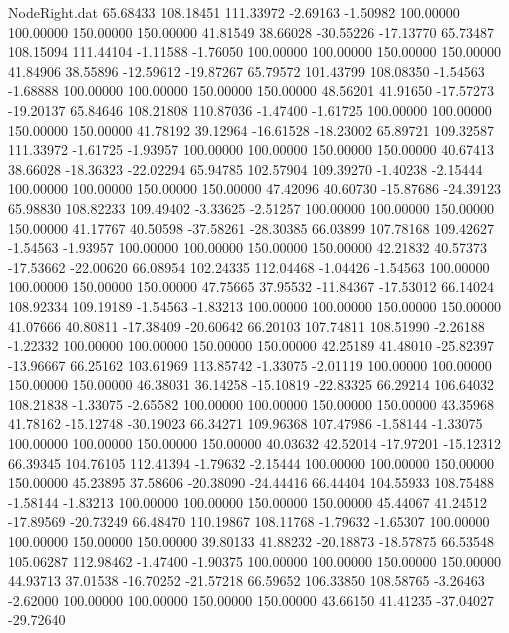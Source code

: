 \begin{filecontents}{NodeRight.dat}
  65.68433  108.18451  111.33972    -2.69163   -1.50982  100.00000  100.00000  150.00000  150.00000   41.81549   38.66028  -30.55226  -17.13770
  65.73487  108.15094  111.44104    -1.11588   -1.76050  100.00000  100.00000  150.00000  150.00000   41.84906   38.55896  -12.59612  -19.87267
  65.79572  101.43799  108.08350    -1.54563   -1.68888  100.00000  100.00000  150.00000  150.00000   48.56201   41.91650  -17.57273  -19.20137
  65.84646  108.21808  110.87036    -1.47400   -1.61725  100.00000  100.00000  150.00000  150.00000   41.78192   39.12964  -16.61528  -18.23002
  65.89721  109.32587  111.33972    -1.61725   -1.93957  100.00000  100.00000  150.00000  150.00000   40.67413   38.66028  -18.36323  -22.02294
  65.94785  102.57904  109.39270    -1.40238   -2.15444  100.00000  100.00000  150.00000  150.00000   47.42096   40.60730  -15.87686  -24.39123
  65.98830  108.82233  109.49402    -3.33625   -2.51257  100.00000  100.00000  150.00000  150.00000   41.17767   40.50598  -37.58261  -28.30385
  66.03899  107.78168  109.42627    -1.54563   -1.93957  100.00000  100.00000  150.00000  150.00000   42.21832   40.57373  -17.53662  -22.00620
  66.08954  102.24335  112.04468    -1.04426   -1.54563  100.00000  100.00000  150.00000  150.00000   47.75665   37.95532  -11.84367  -17.53012
  66.14024  108.92334  109.19189    -1.54563   -1.83213  100.00000  100.00000  150.00000  150.00000   41.07666   40.80811  -17.38409  -20.60642
  66.20103  107.74811  108.51990    -2.26188   -1.22332  100.00000  100.00000  150.00000  150.00000   42.25189   41.48010  -25.82397  -13.96667
  66.25162  103.61969  113.85742    -1.33075   -2.01119  100.00000  100.00000  150.00000  150.00000   46.38031   36.14258  -15.10819  -22.83325
  66.29214  106.64032  108.21838    -1.33075   -2.65582  100.00000  100.00000  150.00000  150.00000   43.35968   41.78162  -15.12748  -30.19023
  66.34271  109.96368  107.47986    -1.58144   -1.33075  100.00000  100.00000  150.00000  150.00000   40.03632   42.52014  -17.97201  -15.12312
  66.39345  104.76105  112.41394    -1.79632   -2.15444  100.00000  100.00000  150.00000  150.00000   45.23895   37.58606  -20.38090  -24.44416
  66.44404  104.55933  108.75488    -1.58144   -1.83213  100.00000  100.00000  150.00000  150.00000   45.44067   41.24512  -17.89569  -20.73249
  66.48470  110.19867  108.11768    -1.79632   -1.65307  100.00000  100.00000  150.00000  150.00000   39.80133   41.88232  -20.18873  -18.57875
  66.53548  105.06287  112.98462    -1.47400   -1.90375  100.00000  100.00000  150.00000  150.00000   44.93713   37.01538  -16.70252  -21.57218
  66.59652  106.33850  108.58765    -3.26463   -2.62000  100.00000  100.00000  150.00000  150.00000   43.66150   41.41235  -37.04027  -29.72640

\end{filecontents}
